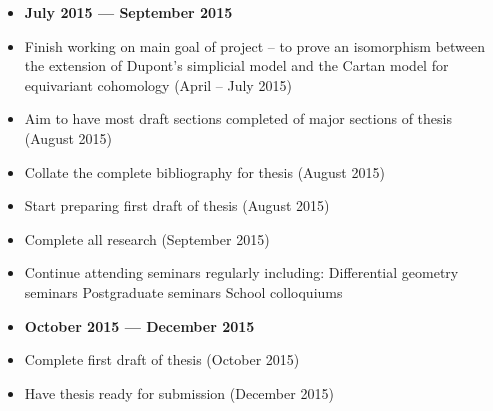 \documentclass[11pt]{article}
\theoremstyle{plain}
\theoremstyle{spartan}
\begin{document}
\begin{itemize}
\item[] \textbf{July 2015 --- September 2015}

\item Finish working on main goal of project -- to prove an isomorphism between the extension of Dupont's simplicial model  and the Cartan model for equivariant cohomology (April -- July 2015)
\item Aim to have most draft sections completed of major sections of thesis (August 2015)
\item Collate the complete bibliography for thesis (August 2015)
\item Start preparing first draft of thesis (August 2015)
\item Complete all research (September 2015)
\item Continue attending seminars regularly including:
	\subitem Differential geometry seminars
	\subitem Postgraduate seminars
	\subitem School colloquiums

\item[] \textbf{October 2015 --- December 2015}

\item Complete first draft of thesis (October 2015)
\item Have thesis ready for submission (December 2015)
\end{itemize}
\end{document}
